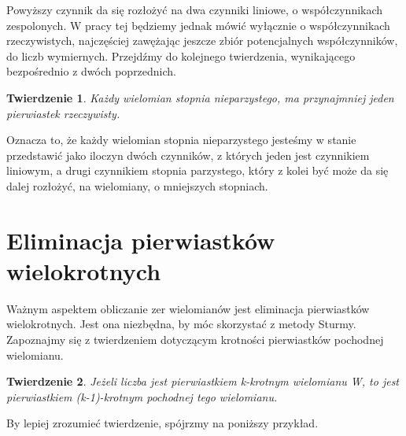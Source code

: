 \documentclass[twoside,a4paper]{book}
\newtheorem{theorem}{Twierdzenie}
\begin{document}
Powyższy czynnik da się rozłożyć na dwa czynniki liniowe, o współczynnikach zespolonych. W pracy tej będziemy jednak mówić wyłącznie o współczynnikach rzeczywistych, najczęściej zawężając jeszcze zbiór potencjalnych współczynników, do liczb wymiernych. Przejdźmy do kolejnego twierdzenia, wynikającego bezpośrednio z dwóch poprzednich.

\begin{theorem}
	Każdy wielomian stopnia nieparzystego, ma przynajmniej jeden pierwiastek rzeczywisty.
\end{theorem}

Oznacza to, że każdy wielomian stopnia nieparzystego jesteśmy w stanie przedstawić jako iloczyn dwóch czynników, z których jeden jest czynnikiem liniowym, a drugi czynnikiem stopnia parzystego, który z kolei być może da się dalej rozłożyć, na wielomiany, o mniejszych stopniach.

\section{Eliminacja pierwiastków wielokrotnych}

Ważnym aspektem obliczanie zer wielomianów jest eliminacja pierwiastków wielokrotnych. Jest ona niezbędna, by móc skorzystać z metody Sturmy. Zapoznajmy się z twierdzeniem dotyczącym krotności pierwiastków pochodnej wielomianu.

\begin{theorem}
	Jeżeli liczba jest pierwiastkiem k-krotnym wielomianu W, to jest pierwiastkiem (k-1)-krotnym pochodnej tego wielomianu.
\end{theorem}

By lepiej zrozumieć twierdzenie, spójrzmy na poniższy przykład.
\end{document}

